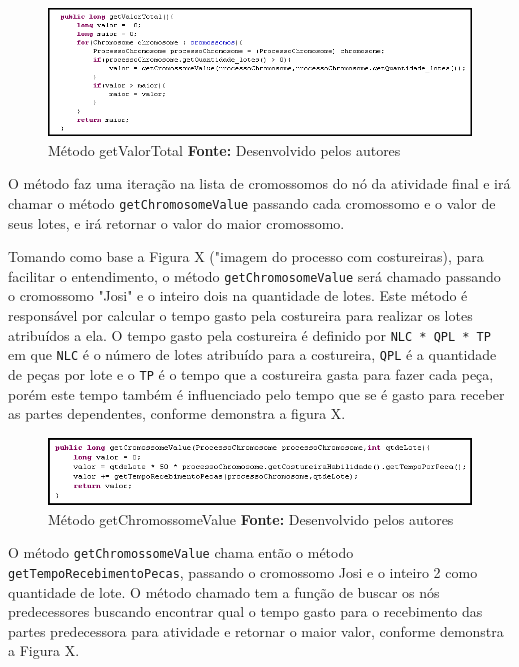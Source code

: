 \begin{figure}[h!]
	\centerline{\includegraphics[scale=0.8]{./imagens/metodo_getValorTotal.png}}
	\caption[Distribuição de trabalho]
	{Método getValorTotal \textbf{Fonte:} Desenvolvido pelos autores}
	\label{fig:exemplo1}
\end{figure}

\par O método faz uma iteração na lista de cromossomos do nó da atividade final e irá chamar o método \texttt{getChromosomeValue} passando 
cada cromossomo e o valor de seus lotes, e irá retornar o valor do maior cromossomo.

\par Tomando como base a Figura X ("imagem do processo com costureiras), para facilitar o entendimento, o método \texttt{getChromosomeValue}
será chamado passando o cromossomo "Josi" e o inteiro dois na quantidade de lotes. Este método é responsável por calcular o tempo gasto 
pela costureira para realizar os lotes atribuídos a ela. O tempo gasto pela costureira é definido por \texttt{NLC * QPL * TP} em que \texttt{NLC} é o número de lotes atribuído para a costureira, \texttt{QPL} é a quantidade de peças por lote e o \texttt{TP} é o tempo
que a costureira gasta para fazer cada peça, porém este tempo também é influenciado pelo tempo que se é gasto para receber as partes dependentes, conforme demonstra a figura X. 

\begin{figure}[h!]
	\centerline{\includegraphics[scale=0.8]{./imagens/metodo_getCromossomeValue.png}}
	\caption[Distribuição de trabalho]
	{Método getChromossomeValue \textbf{Fonte:} Desenvolvido pelos autores}
	\label{fig:exemplo1}
\end{figure}

\par O método \texttt{getChromossomeValue} chama então o método \texttt{getTempoRecebimentoPecas}, passando o cromossomo Josi e 
o inteiro 2 como quantidade de lote. O método chamado tem a função de buscar os nós predecessores buscando encontrar qual o tempo
gasto para o recebimento das partes predecessora para atividade e retornar o maior valor, conforme demonstra a Figura X.

